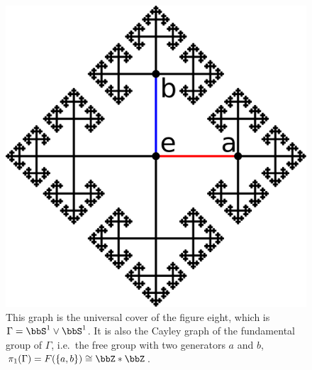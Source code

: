 \begin{figure}
    \centering
        \includegraphics[scale=0.15]{figures/Cayley.pdf}
    \caption{This graph is the universal cover of the figure eight, which is $\Gamma=\bbS^1 \vee \bbS^1$. It is also the Cayley graph of the fundamental group of $\Gamma$, i.e.\ the free group with two generators $a$ and $b$, $\pi_1(\Gamma)=F(\{a,b\})\cong\bbZ\ast\bbZ$. \label{Fig. Cayley}}
\end{figure}

